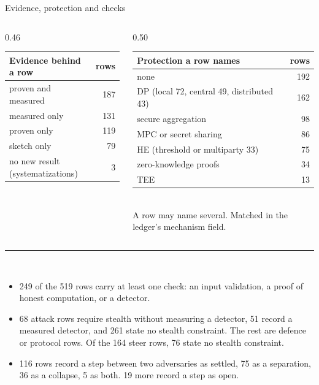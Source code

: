 \documentclass[aspectratio=169,10pt]{beamer}
\newcommand{\redline}{\textcolor{kred}{\rule{\textwidth}{1pt}}}
\begin{document}
\begin{frame}{Evidence, protection and checks}
  \begin{columns}[T]
    \begin{column}{0.46\textwidth}
      \footnotesize
      \begin{tabular}{@{}lr@{}}
        \toprule
        Evidence behind a row & rows\\
        \midrule
        proven and measured & 187\\
        measured only & 131\\
        proven only & 119\\
        sketch only & 79\\
        no new result (systematizations) & 3\\
        \bottomrule
      \end{tabular}
    \end{column}
    \begin{column}{0.50\textwidth}
      \footnotesize
      \begin{tabular}{@{}lr@{}}
        \toprule
        Protection a row names & rows\\
        \midrule
        none & 192\\
        DP (local 72, central 49, distributed 43) & 162\\
        secure aggregation & 98\\
        MPC or secret sharing & 86\\
        HE (threshold or multiparty 33) & 75\\
        zero-knowledge proofs & 34\\
        TEE & 13\\
        \bottomrule
      \end{tabular}\\[0.2em]
      \scriptsize A row may name several. Matched in the ledger's mechanism field.
    \end{column}
  \end{columns}
  \vspace{0.3em}
  \redline\\[0.3em]
  \small
  \begin{itemize}
    \item 249 of the 519 rows carry at least one check: an input validation, a proof of honest computation, or a detector.
    \item 68 attack rows require stealth without measuring a detector, 51 record a measured detector, and 261 state no stealth constraint. The rest are defence or protocol rows. Of the 164 steer rows, 76 state no stealth constraint.
    \item 116 rows record a step between two adversaries as settled, 75 as a separation, 36 as a collapse, 5 as both. 19 more record a step as open.
  \end{itemize}
\end{frame}
\end{document}
